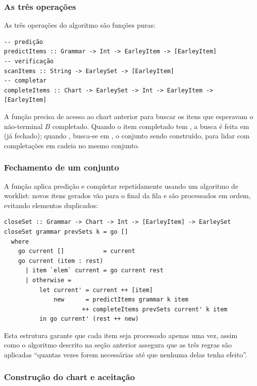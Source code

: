 \subsubsection{As três operações}

As três operações do algoritmo são funções puras:

\begin{verbatim}
-- predição
predictItems :: Grammar -> Int -> EarleyItem -> [EarleyItem]
-- verificação
scanItems :: String -> EarleySet -> [EarleyItem]
-- completar
completeItems :: Chart -> EarleySet -> Int -> EarleyItem -> [EarleyItem]
\end{verbatim}

A função  precisa de acesso ao
chart anterior para buscar os itens que esperavam o não-terminal
\(B\) completado. Quando o item completado tem
, a busca é feita em
 (já fechado); quando
, busca-se em
, o conjunto sendo construído,
para lidar com completações em cadeia no mesmo conjunto.

\subsubsection{Fechamento de um conjunto}

A função  aplica predição e
completar repetidamente usando um algoritmo de worklist: novos itens
gerados vão para o final da fila e são processados em ordem, evitando
elementos duplicados:

\begin{verbatim}
closeSet :: Grammar -> Chart -> Int -> [EarleyItem] -> EarleySet
closeSet grammar prevSets k = go []
  where
    go current []           = current
    go current (item : rest)
      | item `elem` current = go current rest
      | otherwise =
          let current' = current ++ [item]
              new      = predictItems grammar k item
                      ++ completeItems prevSets current' k item
          in go current' (rest ++ new)
\end{verbatim}

Esta estrutura garante que cada item seja processado apenas uma vez,
assim como o algoritmo descrito na seção anterior assegura que as
três regras são aplicadas ``quantas vezes forem necessárias até que
nenhuma delas tenha efeito''.

\subsubsection{Construção do chart e aceitação}

